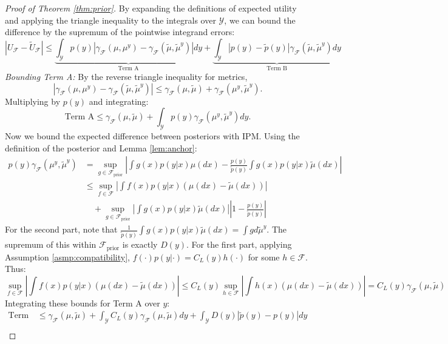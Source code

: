 \documentclass[twoside,11pt]{article}
\begin{document}
\begin{proof}[Proof of Theorem \ref{thm:prior}]
    By expanding the definitions of expected utility and applying the triangle inequality to the integrals over $\mathcal{Y}$, we can bound the difference by the supremum of the pointwise integrand errors:
    $$|U_{\mathcal{F}} - \tilde{U}_{\mathcal{F}}| \le \underbrace{\int_{\mathcal{Y}} p(y) \left| \gamma_{\mathcal{F}}(\mu, \mu^y) - \gamma_{\mathcal{F}}(\tilde{\mu}, \tilde{\mu}^y) \right| dy}_{\text{Term A}} + \underbrace{\int_{\mathcal{Y}} |p(y) - \tilde{p}(y)| \gamma_{\mathcal{F}}(\tilde{\mu}, \tilde{\mu}^y) dy}_{\text{Term B}}$$
    \textit{Bounding Term A:}
    By the reverse triangle inequality for metrics, $$|\gamma_{\mathcal{F}}(\mu, \mu^y) - \gamma_{\mathcal{F}}(\tilde{\mu}, \tilde{\mu}^y)| \le \gamma_{\mathcal{F}}(\mu, \tilde{\mu}) + \gamma_{\mathcal{F}}(\mu^y, \tilde{\mu}^y).$$ Multiplying by $p(y)$ and integrating:
    $$\text{Term A} \le \gamma_{\mathcal{F}}(\mu, \tilde{\mu}) + \int_{\mathcal{Y}} p(y) \gamma_{\mathcal{F}}(\mu^y, \tilde{\mu}^y) dy.$$
    Now we bound the expected difference between posteriors with IPM. Using the definition of the posterior and Lemma \ref{lem:anchor}:
    \begin{align*}
        p(y) \gamma_{\mathcal{F}}(\mu^y, \tilde{\mu}^y) &= \sup_{g \in \mathcal{F}_{\text{prior}}} \left| \int g(x) p(y|x) \mu(dx) - \frac{p(y)}{\tilde{p}(y)} \int g(x) p(y|x) \tilde{\mu}(dx) \right| \\
        & \le \sup_{f \in \mathcal{F}} \left| \int f(x) p(y|x) (\mu(dx) - \tilde{\mu}(dx)) \right|  \\
        & \quad + \sup_{g \in \mathcal{F}_{\text{prior}}} \left| \int g(x) p(y|x) \tilde{\mu}(dx) \right| \left| 1 - \frac{p(y)}{\tilde{p}(y)} \right|
    \end{align*}
    For the second part, note that $\frac{1}{\tilde{p}(y)} \int g(x)p(y|x)\tilde{\mu}(dx) = \int g d\tilde{\mu}^y$. The supremum of this within $\mathcal{F}_{\text{prior}}$ is exactly $D(y)$. For the first part, applying Assumption \ref{asmp:compatibility}, $f(\cdot)p(y|\cdot) = C_L(y) h(\cdot)$ for some $h \in \mathcal{F}$. Thus:$$\sup_{f \in \mathcal{F}} \left| \int f(x) p(y|x) (\mu(dx) - \tilde{\mu}(dx)) \right| \le C_L(y) \sup_{h \in \mathcal{F}} \left| \int h(x) (\mu(dx) - \tilde{\mu}(dx)) \right| = C_L(y) \gamma_{\mathcal{F}}(\mu, \tilde{\mu})$$
    Integrating these bounds for Term A over $y$:
    \begin{align*}\text{Term A} &\le \gamma_{\mathcal{F}}(\mu, \tilde{\mu}) + \int_{\mathcal{Y}} C_L(y) \gamma_{\mathcal{F}}(\mu, \tilde{\mu}) dy + \int_{\mathcal{Y}} D(y) |\tilde{p}(y) - p(y)|  dy \\

\end{align*}
\end{proof}
\end{document}
